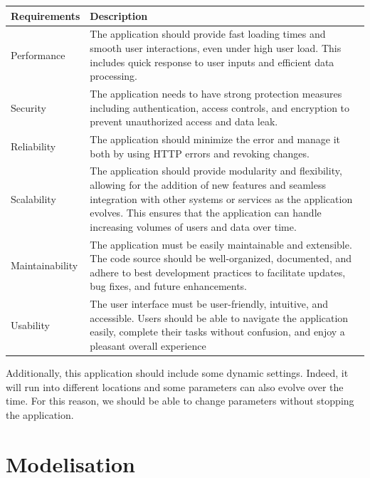 \documentclass[12pt,a4paper,table,english]{article}
\begin{document}
	
	\begin{center}
		\begin{tabular}{| p{3cm} | p{12cm} |}
			\hline
			Requirements & Description \\\hline
		
			Performance & The application should provide fast loading times and smooth user interactions, even under high user load. This includes quick response to user inputs and efficient data processing. \\\hline
		
			Security & The application needs to have strong protection measures including authentication, access controls, and encryption to prevent unauthorized access and data leak. \\\hline
		
			Reliability & The application should minimize the error and manage it both by using HTTP errors and revoking changes. \\\hline
		
			Scalability & The application should provide modularity and flexibility, allowing for the addition of new features and seamless integration with other systems or services as the application evolves. This ensures that the application can handle increasing volumes of users and data over time. \\\hline
		
			Maintainability & The application must be easily maintainable and extensible. The code source should be well-organized, documented, and adhere to best development practices to facilitate updates, bug fixes, and future enhancements. \\\hline
			
			Usability & The user interface must be user-friendly, intuitive, and accessible. Users should be able to navigate the application easily, complete their tasks without confusion, and enjoy a pleasant overall experience \\\hline
		\end{tabular}
	\end{center}
	
	
	Additionally, this application should include some dynamic settings. Indeed, it will run into different locations and some parameters can also evolve over the time. For this reason, we should be able to change parameters without stopping the application.
	
	
	\section{Modelisation}
	
\end{document}
